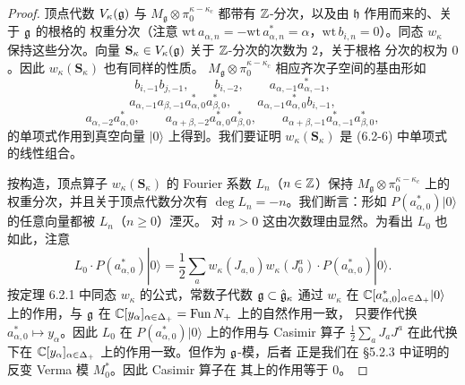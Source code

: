 \begin{proof}
    顶点代数 $V_\kappa(\mathfrak{g})$ 与 $M_{\mathfrak g}\otimes\pi_0^{\kappa-\kappa_c}$
    都带有 $\mathbb{Z}$-分次，以及由 $\mathfrak h$ 作用而来的、关于 $\mathfrak{g}$ 的根格的
    权重分次（注意 $\mathrm{wt}\,a_{\alpha,n}=-\mathrm{wt}\,a^*_{\alpha,n}
    =\alpha$，$\mathrm{wt}\,b_{i,n}=0$）。同态 $w_\kappa$ 保持这些分次。向量
    $\mathbf S_\kappa\in V_\kappa(\mathfrak{g})$ 关于 $\mathbb{Z}$-分次的次数为 $2$，关于根格
    分次的权为 $0$。因此 $w_\kappa(\mathbf S_\kappa)$ 也有同样的性质。
    $M_{\mathfrak g}\otimes\pi_0^{\kappa-\kappa_c}$ 相应齐次子空间的基由形如
    \begin{equation}
        b_{i,-1}b_{j,-1},\qquad b_{i,-2},\qquad
        a_{\alpha,-1}a^*_{\alpha,-1},
        \tag{6.2-6}
    \end{equation}
    \begin{equation}
        a_{\alpha,-1}a_{\beta,-1}a^*_{\alpha,0}a^*_{\beta,0},\qquad
        a_{\alpha,-1}a^*_{\alpha,0}b_{i,-1},
        \tag{6.2-7}
    \end{equation}
    \begin{equation}
        a_{\alpha,-2}a^*_{\alpha,0},\qquad
        a_{\alpha+\beta,-2}a^*_{\alpha,0}a^*_{\beta,0},\qquad
        a_{\alpha+\beta,-1}a^*_{\alpha,-1}a^*_{\beta,0},
        \tag{6.2-8}
    \end{equation}
    的单项式作用到真空向量 $|0\rangle$ 上得到。我们要证明
    $w_\kappa(\mathbf S_\kappa)$ 是 (6.2-6) 中单项式的线性组合。

    按构造，顶点算子 $w_\kappa(\mathbf S_\kappa)$ 的 Fourier 系数
    $L_n$（$n\in\mathbb{Z}$）保持 $M_{\mathfrak g}\otimes\pi_0^{\kappa-\kappa_c}$
    上的权重分次，并且关于顶点代数分次有 $\deg L_n=-n$。我们断言：形如
    $P(a^*_{\alpha,0})|0\rangle$ 的任意向量都被 $L_n$（$n\ge0$）湮灭。
    对 $n>0$ 这由次数理由显然。为看出 $L_0$ 也如此，注意
    \[
        L_0\cdot P(a^*_{\alpha,0})|0\rangle
        =\frac12\sum_aw_\kappa(J_{a,0})w_\kappa(J^a_0)
        \cdot P(a^*_{\alpha,0})|0\rangle.
    \]
    按定理 6.2.1 中同态 $w_\kappa$ 的公式，常数子代数
    $\mathfrak{g}\subset\hat{\mathfrak{g}}_\kappa$ 通过 $w_\kappa$ 在
    $\mathbb{C}[a^*_{\alpha,0}]_{\alpha\in\Delta_+}|0\rangle$ 上的作用，与 $\mathfrak{g}$ 在
    $\mathbb{C}[y_\alpha]_{\alpha\in\Delta_+}=\mathrm{Fun}\,N_+$ 上的自然作用一致，
    只要作代换 $a^*_{\alpha,0}\mapsto y_\alpha$。因此 $L_0$ 在
    $P(a^*_{\alpha,0})|0\rangle$ 上的作用与 Casimir 算子
    $\frac12\sum_aJ_aJ^a$ 在此代换下在
    $\mathbb{C}[y_\alpha]_{\alpha\in\Delta_+}$ 上的作用一致。但作为 $\mathfrak{g}$-模，后者
    正是我们在 \S5.2.3 中证明的反变 Verma 模 $M^*_0$。因此 Casimir 算子在
    其上的作用等于 $0$。


\end{proof}
